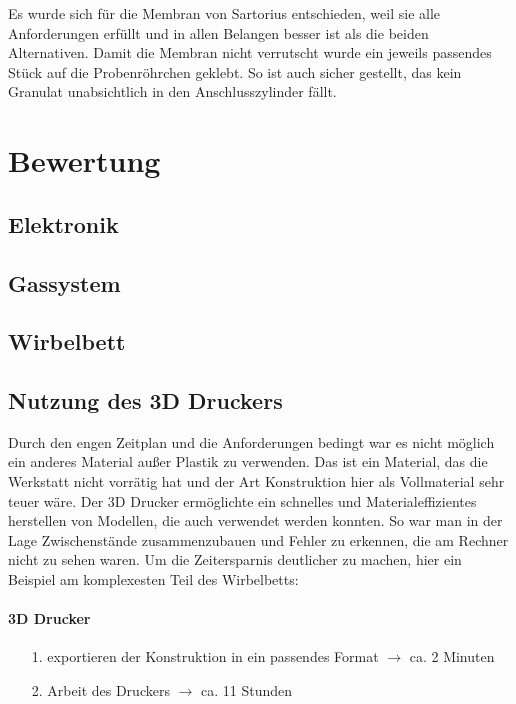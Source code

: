 
\vspace{0.5cm}

Es wurde sich für die Membran von Sartorius entschieden, weil sie alle Anforderungen erfüllt und in allen Belangen besser ist als die beiden Alternativen. Damit die Membran nicht verrutscht wurde ein jeweils passendes Stück auf die Probenröhrchen geklebt. So ist auch sicher gestellt, das kein Granulat unabsichtlich in den Anschlusszylinder fällt.



\section{Bewertung}

\subsection{Elektronik}


\subsection{Gassystem}


\subsection{Wirbelbett}


\subsection{Nutzung des 3D Druckers}

Durch den engen Zeitplan und die Anforderungen bedingt war es nicht möglich ein anderes Material außer Plastik zu verwenden. Das ist ein Material, das die Werkstatt nicht vorrätig hat und der Art Konstruktion hier als Vollmaterial sehr teuer wäre. Der 3D Drucker ermöglichte ein schnelles und Materialeffizientes herstellen von Modellen, die auch verwendet werden konnten. So war man in der Lage Zwischenstände zusammenzubauen und Fehler zu erkennen, die am Rechner nicht zu sehen waren. Um die Zeitersparnis deutlicher zu machen, hier ein Beispiel am komplexesten Teil des Wirbelbetts: \\
\paragraph{3D Drucker}
\begin{itemize}
	\item[1.] exportieren der Konstruktion in ein passendes Format $\rightarrow$ ca. 2 Minuten
	\item[2.] Arbeit des Druckers $\rightarrow$ ca. 11 Stunden
\end{itemize}

